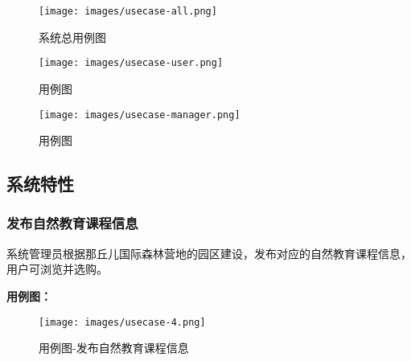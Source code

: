 \begin{figure}[H]
 \centering
 \texttt{[image: images/usecase-all.png]}
 \caption{
    系统总用例图
  }
 \label{fig:uc1}
 \vspace{-\medskipamount}
\end{figure}

\begin{figure}[H]
 \centering
 \texttt{[image: images/usecase-user.png]}
 \caption{
    用例图
  }
 \label{fig:uc2}
 \vspace{-\medskipamount}
\end{figure}

\begin{figure}[H]
 \centering
 \texttt{[image: images/usecase-manager.png]}
 \caption{
    用例图
  }
 \label{fig:uc3}
 \vspace{-\medskipamount}
\end{figure}

\subsection{系统特性}
\subsubsection{发布自然教育课程信息}

系统管理员根据那丘儿国际森林营地的园区建设，发布对应的自然教育课程信息，用户可浏览并选购。

\textbf{用例图：}
\begin{figure}[H]
 \centering
 \texttt{[image: images/usecase-4.png]}
 \caption{
    用例图-发布自然教育课程信息
  }
 \label{fig:uc4}
 \vspace{-\medskipamount}
\end{figure}

%

